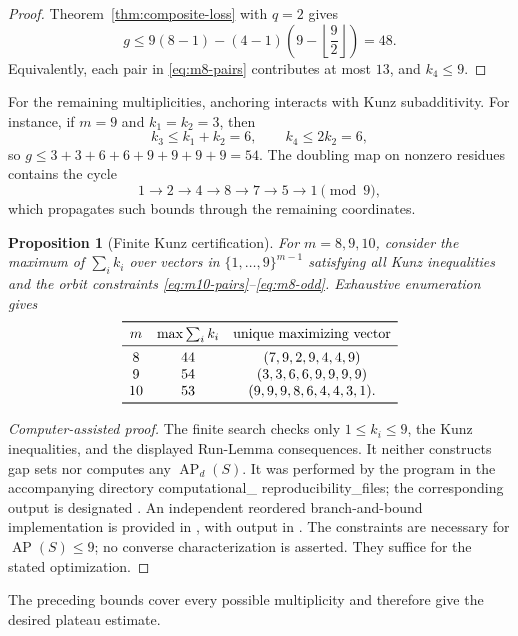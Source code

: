 \documentclass[11pt]{article}
\theoremstyle{plain}
\newtheorem{proposition}[theorem]{Proposition}
\theoremstyle{definition}
\theoremstyle{remark}
\newcommand{\AP}{\operatorname{AP}}
\newcommand{\compdir}{{\small\ttfamily computational\_\allowbreak
  reproducibility\_\allowbreak files}}
\begin{document}
\begin{proof}
Theorem~\ref{thm:composite-loss} with $q=2$ gives
\[
  g\leq9(8-1)-(4-1)\left(9-\left\lfloor\frac92\right\rfloor\right)=48.
\]
Equivalently, each pair in \eqref{eq:m8-pairs} contributes at most $13$,
and $k_4\leq9$.
\end{proof}

For the remaining multiplicities, anchoring interacts with Kunz
subadditivity.  For instance, if $m=9$ and
$k_1=k_2=3$, then
\[
  k_3\leq k_1+k_2=6,
  \qquad k_4\leq2k_2=6,
\]
so $g\leq3+3+6+6+9+9+9+9=54$.  The doubling map on nonzero residues
contains the cycle
\[
  1\to2\to4\to8\to7\to5\to1\pmod9,
\]
which propagates such bounds through the remaining coordinates.

\begin{proposition}[Finite Kunz certification]\label{prop:finite-certificate}
For $m=8,9,10$, consider the maximum of $\sum_i k_i$ over vectors in
$\{1,\ldots,9\}^{m-1}$ satisfying all Kunz inequalities and the orbit
constraints \eqref{eq:m10-pairs}--\eqref{eq:m8-odd}.  Exhaustive enumeration
gives
\[
\begin{array}{ccc}
  \toprule
  m&\max\sum_i k_i&\text{unique maximizing vector}\\
  \midrule
  8&44&(7,9,2,9,4,4,9)\\
  9&54&(3,3,6,6,9,9,9,9)\\
  10&53&(9,9,9,8,6,4,4,3,1).\\
  \bottomrule
\end{array}
\]
\end{proposition}

\begin{proof}[Computer-assisted proof]
The finite search checks only $1\leq k_i\leq9$, the Kunz inequalities, and
the displayed Run-Lemma consequences.  It neither constructs gap sets nor
computes any $\AP_d(S)$.  It was performed by
the program  in the accompanying directory
\compdir{}; the corresponding output is
designated .  An independent reordered
branch-and-bound implementation is provided in
, with output in
.  The constraints are
necessary for $\AP(S)\leq9$; no converse characterization is asserted.  They
suffice for the stated optimization.
\end{proof}

The preceding bounds cover every possible multiplicity and therefore give
the desired plateau estimate.
\end{document}
